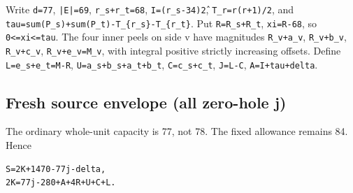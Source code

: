 \documentclass[10pt,a4paper]{article}
\theoremstyle{definition}
\begin{document}
Write \texttt{d=\allowbreak{}77},\allowbreak{} \texttt{|E|=\allowbreak{}69},\allowbreak{}
\texttt{r\_\allowbreak{}\allowbreak{}s+\allowbreak{}r\_\allowbreak{}\allowbreak{}t=\allowbreak{}68},\allowbreak{}
\texttt{I=\allowbreak{}(r\_\allowbreak{}\allowbreak{}s-34)\^2},\allowbreak{}
\texttt{T\_\allowbreak{}\allowbreak{}r=\allowbreak{}r(r+\allowbreak{}1)/\allowbreak{}2},\allowbreak{} and
\texttt{tau=\allowbreak{}sum(P\_\allowbreak{}\allowbreak{}s)+\allowbreak{}sum(P\_\allowbreak{}\allowbreak{}t)-T\_\allowbreak{}\allowbreak{}\{r\_\allowbreak{}\allowbreak{}s\}-T\_\allowbreak{}\allowbreak{}\{r\_\allowbreak{}\allowbreak{}t\}}.
Put \texttt{R=\allowbreak{}R\_\allowbreak{}\allowbreak{}s+\allowbreak{}R\_\allowbreak{}\allowbreak{}t},\allowbreak{}
\texttt{xi=\allowbreak{}R-68},\allowbreak{} so
\texttt{0<=\allowbreak{}xi<=\allowbreak{}tau}. The four inner peels on side v
have magnitudes \texttt{R\_\allowbreak{}\allowbreak{}v+\allowbreak{}a\_\allowbreak{}\allowbreak{}v},\allowbreak{}
\texttt{R\_\allowbreak{}\allowbreak{}v+\allowbreak{}b\_\allowbreak{}\allowbreak{}v},\allowbreak{}
\texttt{R\_\allowbreak{}\allowbreak{}v+\allowbreak{}c\_\allowbreak{}\allowbreak{}v},\allowbreak{}
\texttt{R\_\allowbreak{}\allowbreak{}v+\allowbreak{}e\_\allowbreak{}\allowbreak{}v=\allowbreak{}M\_\allowbreak{}\allowbreak{}v},\allowbreak{} with integral positive
strictly increasing offsets. Define
\texttt{L=\allowbreak{}e\_\allowbreak{}\allowbreak{}s+\allowbreak{}e\_\allowbreak{}\allowbreak{}t=\allowbreak{}M-R},\allowbreak{}
\texttt{U=\allowbreak{}a\_\allowbreak{}\allowbreak{}s+\allowbreak{}b\_\allowbreak{}\allowbreak{}s+\allowbreak{}a\_\allowbreak{}\allowbreak{}t+\allowbreak{}b\_\allowbreak{}\allowbreak{}t},\allowbreak{}
\texttt{C=\allowbreak{}c\_\allowbreak{}\allowbreak{}s+\allowbreak{}c\_\allowbreak{}\allowbreak{}t},\allowbreak{} \texttt{J=\allowbreak{}L-C},\allowbreak{}
\texttt{A=\allowbreak{}I+\allowbreak{}tau+\allowbreak{}delta}.

\hypertarget{fresh-source-envelope-all-zero-hole-j}{%
\subsection{Fresh source envelope (all zero-hole
j)}\label{fresh-source-envelope-all-zero-hole-j}}

The ordinary whole-unit capacity is 77,\allowbreak{} not 78. The fixed allowance
remains 84. Hence

\begin{lstlisting}
S=2K+1470-77j-delta,
2K=77j-280+A+4R+U+C+L.
\end{lstlisting}
\end{document}
